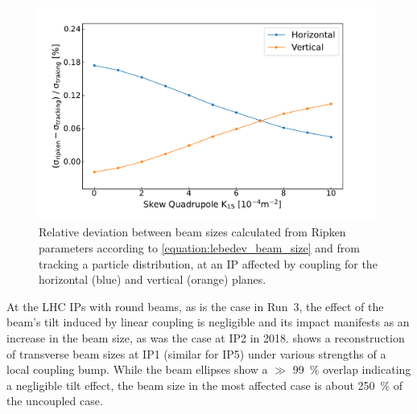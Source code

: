 \begin{figure}[!htb]
    \centering
    \includegraphics*[width=0.99\textwidth]{Figures/IR_Coupling_Correction/lebedev_vs_tracking.pdf}
    \caption{Relative deviation between beam sizes calculated from Ripken parameters according to \cref{equation:lebedev_beam_size} and from tracking a particle distribution, at an IP affected by coupling for the horizontal (\textcolor{mplblue}{blue}) and vertical (\textcolor{mplorange}{orange}) planes.}
    \label{figure:lebedev_vs_tracking}
\end{figure}

At the LHC IPs with round beams, as is the case in Run~\num{3}, the effect of the beam's tilt induced by linear coupling is negligible and its impact manifests as an increase in the beam size, as was the case at IP\num{2} in \num{2018}.
 shows a reconstruction of transverse beam sizes at IP\num{1} (similar for IP\num{5}) under various strengths of a local coupling bump.
While the beam ellipses show a \(\gg\) \qty{99}{\percent} overlap indicating a negligible tilt effect, the beam size in the most affected case is about \qty{250}{\percent} of the uncoupled case.

